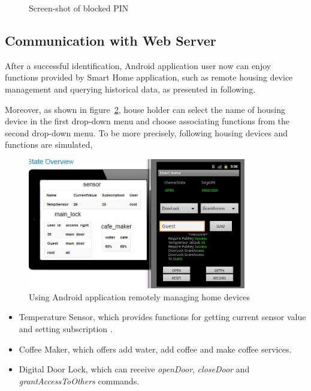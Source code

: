 \begin{figure}[!htb]
\begin{minipage}{0.49\linewidth}
  \caption{Screen-shot of blocked PIN}
  \label{fig:sub2}
\end{minipage}
  \end{figure}

\subsection{Communication with Web Server}
After a successful identification, Android application user now can enjoy functions provided by Smart Home application, such as remote housing device management and querying historical data, as presented in following.

Moreover, as shown in figure~\ref{fig:housing-device}, house holder can select the name of housing device in the first drop-down menu and  choose associating functions from the second drop-down menu. To be more precisely, following housing devices and functions are simulated,
\begin{figure}[!htb]
	\centering
	\includegraphics[width=0.85\textwidth]{Images/impl/housing-device.jpg}
		\caption{Using Android application remotely managing home devices}
	\label{fig:housing-device}
\end{figure}

\begin{itemize}
\item Temperature Sensor, which provides functions for getting current sensor value and setting subscription .
\item Coffee Maker,  which offers add water, add coffee and make coffee services.
\item Digital Door Lock, which can receive  \emph{openDoor}, \emph{closeDoor} and  \emph{grantAccessToOthers} commands.
\end{itemize}

